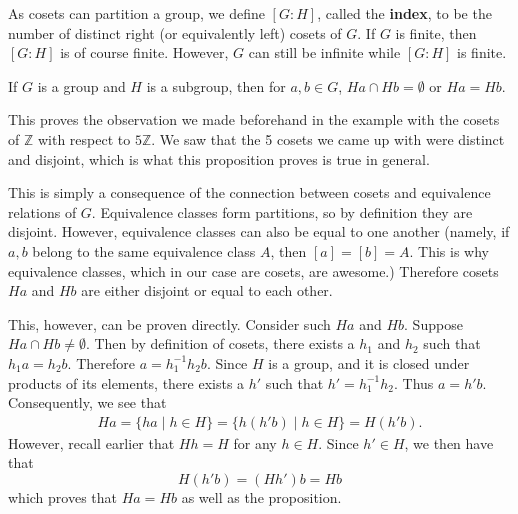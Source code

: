 \documentclass[12pt,letterpaper]{algebra_book}
\newcommand{\ZZ}{\mathbb{Z}}
\theoremstyle{definition}
\begin{document}
    As cosets can partition a group, we define $[G:H]$, called the
    \textbf{index}, to be the
    number of distinct right (or equivalently left) cosets of $G$.
    If $G$ is finite, then $[G:H]$ is of course finite. However, $G$
    can still be infinite while $[G:H]$ is finite.

    \begin{proposition}
        If $G$ is a group and $H$ is a subgroup, then for $a, b \in
        G$, $Ha \cap Hb = \emptyset$ or $Ha = Hb$.
    \end{proposition}

    This proves the observation we made beforehand in the example with
    the cosets of $\ZZ$ with respect to $5\ZZ$. We saw that the 5 cosets
    we came up with were distinct and disjoint, which is what this
    proposition proves is true in general.

    \begin{prf}
        This is simply a consequence of the connection between cosets
        and 
        equivalence relations of $G$. Equivalence classes form partitions,
        so by definition they are disjoint. However, equivalence classes
        can also be equal to one another (namely, if $a, b$ belong to the
        same equivalence class $A$, then $[a] = [b] = A$. This is why
        equivalence classes, which in our case are cosets, are
        awesome.) Therefore cosets $Ha$ and $Hb$ are either disjoint or
        equal to each other.

        This, however, can be proven directly. Consider such $Ha$ and
        $Hb$. Suppose $Ha \cap Hb \ne \emptyset$. Then by definition
        of cosets, there exists a $h_1$ and $h_2$ such that $h_1a = h_2b$.
        Therefore $a = h_1^{-1}h_2b$. Since $H$ is a group, and it is
        closed under products of its elements, there exists a
        $h'$ such that $h'= h_1^{-1}h_2$. Thus $a = h'b$.
        Consequently, we see that 
        \begin{align*}
            Ha = \{ha \mid h \in H\} = \{h(h'b) \mid h \in H\} = H(h'b).
        \end{align*}
        However, recall earlier that $Hh = H$ for any $h \in H$. Since
        $h' \in H$, we then have that 
        \[
            H(h'b) = (Hh')b = Hb
        \]
        which proves that $Ha = Hb$ as well as the proposition.
    \end{prf}
\end{document}
